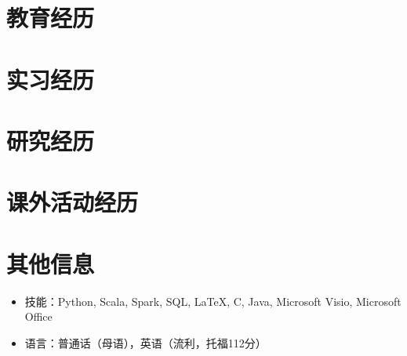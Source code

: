 \documentclass{resumeZH}
\begin{document}
\section{教育经历}

\thuundergrad
\umnexchange

\section{实习经历}

\continental
\summitview

\section{研究经历}

\fifaresearch

\section{课外活动经历}

\eydatascience

\section{其他信息}

\vspace{0.618ex}
\begin{itemize}
\item 技能：Python, Scala, Spark, SQL, {\LaTeX}, C, Java, Microsoft Visio, Microsoft Office
\item 语言：普通话（母语），英语（流利，托福112分）
\end{itemize}
\end{document}
